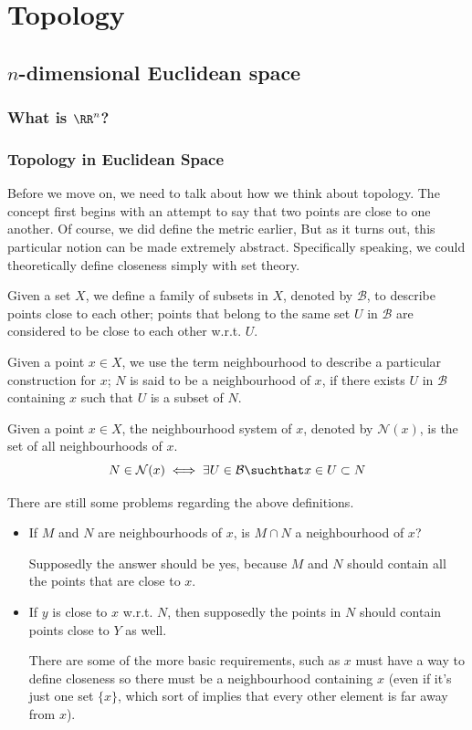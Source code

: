 \part{Topology}
\chapter{$n$-dimensional Euclidean space}
\section{What is $\RR^n$?}


\section{Topology in Euclidean Space}
Before we move on, we need to talk about how we think about topology. The concept first begins with an attempt to say that two points are close to one another. Of course, we did define the metric earlier, But as it turns out, this particular notion can be made extremely abstract. Specifically speaking, we could theoretically define closeness simply with set theory.

\begin{definition}
Given a set $X$, we define a family of subsets in $X$, denoted by $\mathcal{B}$, to describe points close to each other; points that belong to the same set $U$ in $\mathcal{B}$ are considered to be close to each other w.r.t. $U$.
\end{definition}

\begin{definition}[Neighbourhood]
Given a point $x \in X$, we use the term neighbourhood to describe a particular construction for $x$; $N$ is said to be a neighbourhood of $x$, if there exists $U$ in $\mathcal{B}$ containing $x$ such that $U$ is a subset of $N$.
\end{definition}

\begin{definition}
Given a point $x \in X$, the neighbourhood system of $x$, denoted by $\mathcal{N}(x)$, is the set of all neighbourhoods of $x$.
\[ N\in\mathcal{N}(x) \iff \exists U\in\mathcal{B} \suchthat x\in U\subset N \]
\end{definition}

There are still some problems regarding the above definitions.
\begin{itemize}
\item If $M$ and $N$ are neighbourhoods of $x$, is $M\cap N$ a neighbourhood of $x$?

Supposedly the answer should be yes, because $M$ and $N$ should contain all the points that are close to $x$.

\item If $y$ is close to $x$ w.r.t. $N$, then supposedly the points in $N$ should contain points close to $Y$ as well.

There are some of the more basic requirements, such as $x$ must have a way to define closeness so there must be a neighbourhood containing $x$ (even if it's just one set $\{x\}$, which sort of implies that every other element is far away from $x$).
\end{itemize}

